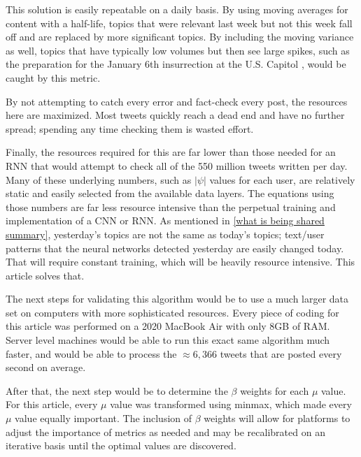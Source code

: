 \documentclass[preprint,review,12pt]{elsarticle}
\begin{document}
This solution is easily repeatable on a daily basis. By using moving averages for content with a half-life, topics that were relevant last week but not this week fall off and are replaced by more significant topics. By including the moving variance as well, topics that have typically low volumes but then see large spikes, such as the preparation for the January 6th insurrection at the U.S. Capitol \cite{Levenson2021capitol}, would be caught by this metric. 

By not attempting to catch every error and fact-check every post, the resources here are maximized. Most tweets quickly reach a dead end and have no further spread; spending any time checking them is wasted effort. 

Finally, the resources required for this are far lower than those needed for an RNN that would attempt to check all of the 550 million tweets written per day. Many of these underlying numbers, such as $|\psi|$ values for each user, are relatively static and easily selected from the available data layers. The equations using those numbers are far less resource intensive than the perpetual training and implementation of a CNN or RNN. As mentioned in \ref{what is being shared summary}, yesterday's topics are not the same as today's topics; text/user patterns that the neural networks detected yesterday are easily changed today. That will require constant training, which will be heavily resource intensive. This article solves that.

The next steps for validating this algorithm would be to use a much larger data set on computers with more sophisticated resources. Every piece of coding for this article was performed on a 2020 MacBook Air with only 8GB of RAM. Server level machines would be able to run this exact same algorithm much faster, and would be able to process the $\approx 6,366$ tweets that are posted every second on average. 

After that, the next step would be to determine the $\beta$ weights for each $\mu$ value. For this article, every $\mu$ value was transformed using minmax, which made every $\mu$ value equally important. The inclusion of $\beta$ weights will allow for platforms to adjust the importance of metrics as needed and may be recalibrated on an iterative basis until the optimal values are discovered.



\newpage
 

\end{document}
